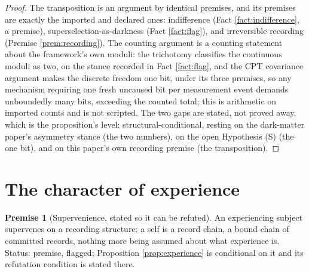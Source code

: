 \documentclass[11pt]{article}
\theoremstyle{definition}
\newtheorem{premise}[theorem]{Premise}
\begin{document}
\begin{proof}
The transposition is an argument by identical premises, and its premises are exactly the imported and declared ones: indifference (Fact \ref{fact:indifference}, a premise), superselection-as-darkness (Fact \ref{fact:flag}), and irreversible recording (Premise \ref{prem:recording}). The counting argument is a counting statement about the framework's own moduli: the trichotomy classifies the continuous moduli as two, on the stance recorded in Fact \ref{fact:flag}, and the CPT covariance argument makes the discrete freedom one bit, under its three premises, so any mechanism requiring one fresh uncaused bit per measurement event demands unboundedly many bits, exceeding the counted total; this is arithmetic on imported counts and is not scripted. The two gaps are stated, not proved away, which is the proposition's level: structural-conditional, resting on the dark-matter paper's asymmetry stance (the two numbers), on the open Hypothesis (S) (the one bit), and on this paper's own recording premise (the transposition).
\end{proof}

\section{The character of experience}\label{sec:experience}

\begin{premise}[Supervenience, stated so it can be refuted]\label{prem:supervenience}
An experiencing subject supervenes on a recording structure: a self is a record chain, a bound chain of committed records, nothing more being assumed about what experience is. Status: premise, flagged; Proposition \ref{prop:experience} is conditional on it and its refutation condition is stated there.
\end{premise}
\end{document}

